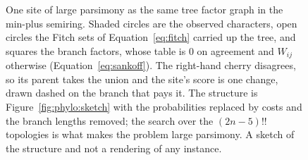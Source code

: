 \begin{figure}[htbp]
\centering
{}
\caption{One site of large parsimony as the same tree factor graph in the
min-plus semiring. Shaded circles are the observed characters, open circles
the Fitch sets of Equation~\ref{eq:fitch} carried up the tree, and squares
the branch factors, whose table is $0$ on agreement and $W_{ij}$ otherwise
(Equation~\ref{eq:sankoff}). The right-hand cherry disagrees, so its parent
takes the union and the site's score is one change, drawn dashed on the
branch that pays it. The structure is Figure~\ref{fig:phylo:sketch} with the
probabilities replaced by costs and the branch lengths removed; the search
over the $(2n-5)!!$ topologies is what makes the problem large parsimony. A
sketch of the structure and not a rendering of any instance.}
\label{fig:parsimony:sketch}
\end{figure}
